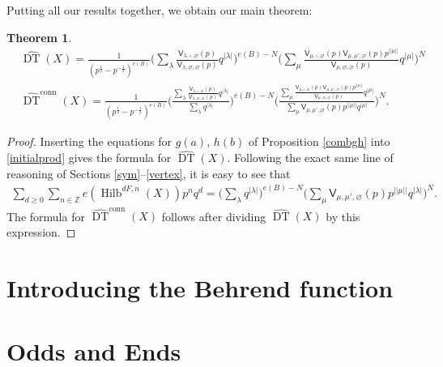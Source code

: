 \documentclass{amsart}
\newtheorem{theorem}{Theorem}%
\theoremstyle{definition}
\newcommand{\ZZ} {\mathbb{Z}}		%
\newcommand{\sfV}{\mathsf{V}}
\newcommand{\Hilb}{\operatorname{Hilb}}
\newcommand{\DT}{\operatorname{DT}}
\newcommand{\conn}{\operatorname{conn}}
\begin{document}
Putting all our results together, we obtain our main theorem:
\begin{theorem} \label{main}
\begin{align*}
&\widehat{\DT}(X) = \frac{1}{(p^{\frac{1}{2}} - p^{-\frac{1}{2}})^{e(B)}} \Bigg( \sum_{\lambda} \frac{\sfV_{\lambda,\square,\varnothing}(p)}{\sfV_{\lambda,\varnothing,\varnothing}(p)} q^{|\lambda|} \Bigg)^{e(B) - N}  \Bigg( \sum_{\mu} \frac{\sfV_{\mu,\square,\varnothing}(p) \sfV_{\mu,\mu',\varnothing}(p) p^{|\!|\mu|\!|}}{\sfV_{\mu,\varnothing,\varnothing}(p)} q^{|\mu|} \Bigg)^{N} \\
&\widehat{\DT}^{\conn}(X) = \frac{1}{(p^{\frac{1}{2}} - p^{-\frac{1}{2}})^{e(B)}} \Bigg( \frac{\sum_{\lambda} \frac{\sfV_{\lambda,\square,\varnothing}(p)}{\sfV_{\lambda,\varnothing,\varnothing}(p)} q^{|\lambda|}}{\sum_{\lambda} q^{|\lambda|}} \Bigg)^{e(B) - N}  \Bigg( \frac{\sum_{\mu} \frac{\sfV_{\mu,\square,\varnothing}(p) \sfV_{\mu,\mu',\varnothing}(p) p^{|\!|\mu|\!|}}{\sfV_{\mu,\varnothing,\varnothing}(p)} q^{|\mu|}}{\sum_{\mu} \sfV_{\mu, \mu', \varnothing}(p) p^{|\!|\mu|\!|} q^{|\mu|}} \Bigg)^{N}.
\end{align*}
\end{theorem}
\begin{proof}
Inserting the equations for $g(a)$, $h(b)$ of Proposition \ref{combgh} into \eqref{initialprod} gives the formula for $\widehat{\DT}(X)$. Following the exact same line of reasoning of Sections \ref{sym}--\ref{vertex}, it is easy to see that
\begin{align*}
\sum_{d \geq 0} \sum_{n \in \ZZ} e(\Hilb^{dF,n}(X)) p^n q^d = \Bigg( \sum_{\lambda} q^{|\lambda|} \Bigg)^{e(B) - N} \Bigg( \sum_{\mu} \sfV_{\mu,\mu',\varnothing}(p) p^{|\!|\mu|\!|} q^{|\lambda|} \Bigg)^{N}.
\end{align*}
The formula for $\widehat{\DT}^{\conn}(X)$ follows after dividing $\widehat{\DT}(X)$ by this expression.
\end{proof}


\section{Introducing the Behrend function} \label{Behrend}


\appendix
\section{Odds and Ends}\label{appendix: odds and ends}
\end{document}
